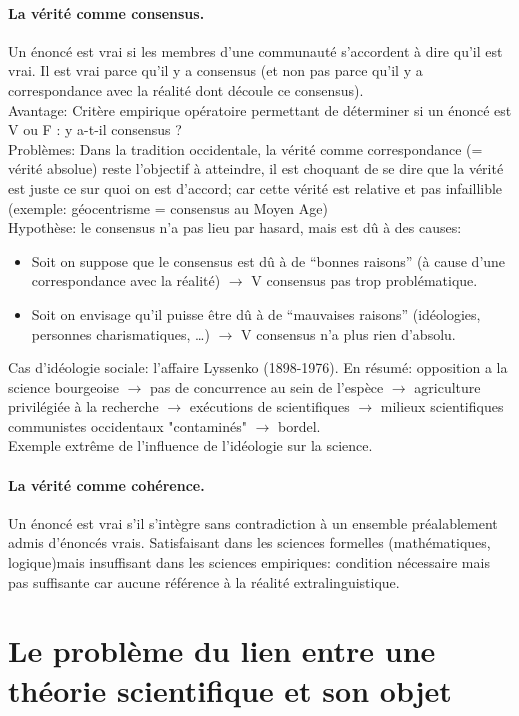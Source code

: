 \documentclass{report}
\begin{document}
	\paragraph{La vérité comme consensus.} Un énoncé est vrai si les membres d’une communauté s’accordent à dire qu’il est vrai. Il est vrai parce qu’il y a consensus (et non pas parce qu’il y a correspondance avec la réalité dont découle ce consensus).\\
	Avantage:  Critère empirique opératoire permettant de déterminer si un énoncé est V ou F : y a-t-il consensus ?\\
	Problèmes: Dans la tradition occidentale, la vérité comme correspondance (= vérité absolue) reste l’objectif à atteindre, il est choquant de se dire que la vérité est juste ce sur quoi on est d’accord; car cette vérité est relative et pas infaillible (exemple: géocentrisme = consensus au Moyen Age)\\
	Hypothèse: le consensus n’a pas lieu par hasard, mais est dû à des causes:
	\begin{itemize}
		\item Soit on suppose que le consensus est dû à de “bonnes raisons” (à cause d’une correspondance avec la réalité) $\rightarrow$ V consensus pas trop problématique.
		\item Soit on envisage qu’il puisse être dû à de “mauvaises raisons” (idéologies, personnes charismatiques, …) $\rightarrow$ V consensus n’a plus rien d’absolu.
	\end{itemize}
	Cas d'idéologie sociale: l’affaire Lyssenko (1898-1976). En résumé: opposition a la science bourgeoise $\rightarrow$ pas de concurrence au sein de l'espèce $\rightarrow$ agriculture privilégiée à la recherche $\rightarrow$ exécutions de scientifiques $\rightarrow$ milieux scientifiques communistes occidentaux "contaminés" $\rightarrow$ bordel.\\
	Exemple extrême de l’influence de l’idéologie sur la science.
	
	\paragraph{La vérité comme cohérence.} Un énoncé est vrai s’il s’intègre sans contradiction à un ensemble préalablement admis d’énoncés vrais. Satisfaisant dans les sciences formelles (mathématiques, logique)mais insuffisant dans les sciences empiriques: condition nécessaire mais pas suffisante car aucune référence à la réalité extralinguistique.
	
	\section[Lien théorie-objet]{Le problème du lien entre une théorie scientifique et son objet}
	
\end{document}
